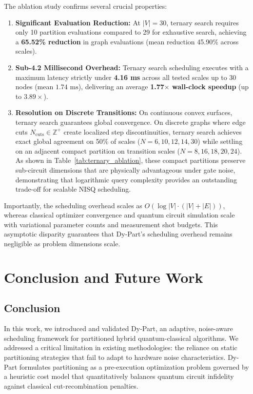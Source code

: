 \documentclass[pdflatex,sn-mathphys-num]{sn-jnl}
\theoremstyle{thmstyleone}
\theoremstyle{thmstyletwo}%
\theoremstyle{thmstylethree}%
\begin{document}
The ablation study confirms several crucial properties:
\begin{enumerate}
    \item \textbf{Significant Evaluation Reduction:} At $|V|=30$, ternary search requires only 10 partition evaluations compared to 29 for exhaustive search, achieving a \textbf{65.52\% reduction} in graph evaluations (mean reduction 45.90\% across scales).
    \item \textbf{Sub-4.2 Millisecond Overhead:} Ternary search scheduling executes with a maximum latency strictly under \textbf{4.16 ms} across all tested scales up to 30 nodes (mean $1.74\text{ ms}$), delivering an average \textbf{1.77$\times$ wall-clock speedup} (up to $3.89\times$).
    \item \textbf{Resolution on Discrete Transitions:} On continuous convex surfaces, ternary search guarantees global convergence. On discrete graphs where edge cuts $N_{\text{cuts}} \in \mathbb{Z}^+$ create localized step discontinuities, ternary search achieves exact global agreement on 50\% of scales ($N = 6, 10, 12, 14, 30$) while settling on an adjacent compact partition on transition scales ($N = 8, 16, 18, 20, 24$). As shown in Table~\ref{tab:ternary_ablation}, these compact partitions preserve sub-circuit dimensions that are physically advantageous under gate noise, demonstrating that logarithmic query complexity provides an outstanding trade-off for scalable NISQ scheduling.
\end{enumerate}

Importantly, the scheduling overhead scales as $O(\log |V| \cdot (|V| + |E|))$, whereas classical optimizer convergence and quantum circuit simulation scale with variational parameter counts and measurement shot budgets. This asymptotic disparity guarantees that Dy-Part's scheduling overhead remains negligible as problem dimensions scale.


\section{Conclusion and Future Work}\label{sec6}

\subsection{Conclusion}

In this work, we introduced and validated Dy-Part, an adaptive, noise-aware scheduling framework for partitioned hybrid quantum-classical algorithms. We addressed a critical limitation in existing methodologies: the reliance on static partitioning strategies that fail to adapt to hardware noise characteristics. Dy-Part formulates partitioning as a pre-execution optimization problem governed by a heuristic cost model that quantitatively balances quantum circuit infidelity against classical cut-recombination penalties.
\end{document}
